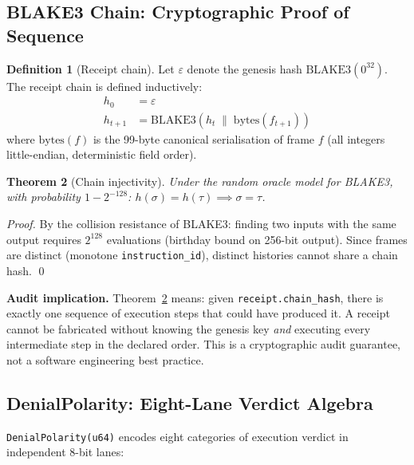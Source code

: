 \documentclass[12pt,a4paper]{article}
\newtheorem{theorem}{Theorem}[section]
\theoremstyle{definition}
\newtheorem{definition}[theorem]{Definition}
\theoremstyle{remark}
\begin{document}
\subsection{BLAKE3 Chain: Cryptographic Proof of Sequence}

\begin{definition}[Receipt chain]
\label{def:chain}
Let $\varepsilon$ denote the genesis hash $\mathrm{BLAKE3}(0^{32})$.
The receipt chain is defined inductively:
\begin{align*}
  h_0          &= \varepsilon \\
  h_{t+1}      &= \mathrm{BLAKE3}(h_t \;\|\; \mathrm{bytes}(f_{t+1}))
\end{align*}
where $\mathrm{bytes}(f)$ is the 99-byte canonical serialisation of frame $f$
(all integers little-endian, deterministic field order).
\end{definition}

\begin{theorem}[Chain injectivity]
\label{thm:chaininjective}
Under the random oracle model for BLAKE3, with probability $1 - 2^{-128}$:
$h(\sigma) = h(\tau) \implies \sigma = \tau$.
\end{theorem}
\begin{proof}
By the collision resistance of BLAKE3: finding two inputs with the same output
requires $2^{128}$ evaluations (birthday bound on 256-bit output).
Since frames are distinct (monotone \texttt{instruction\_id}), distinct histories
cannot share a chain hash. \qed
\end{proof}

\begin{claimbox}
\textbf{Audit implication.}
Theorem~\ref{thm:chaininjective} means: given \texttt{receipt.chain\_hash},
there is exactly one sequence of execution steps that could have produced it.
A receipt cannot be fabricated without knowing the genesis key \emph{and} executing
every intermediate step in the declared order.
This is a cryptographic audit guarantee, not a software engineering best practice.
\end{claimbox}

\subsection{DenialPolarity: Eight-Lane Verdict Algebra}

\texttt{DenialPolarity(u64)} encodes eight categories of execution verdict
in independent 8-bit lanes:
\end{document}
